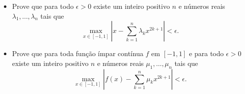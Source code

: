 \begin{itemize}
\item[(a)] Prove que para todo \(\epsilon>0\) existe um inteiro positivo \(n\) e números reais \(\lambda_{1},\dots,\lambda_{n}\) tais que
\[\max_{x\in [-1,1]}|x-\sum_{k=1}^{n}\lambda_{k}x^{2k+1}|<\epsilon.\]
\item[(b)] Prove que para toda função ímpar contínua \(f\) em \([-1,1]\) e para todo \(\epsilon>0\) existe um inteiro positivo \(n\) e números reais \(\mu_{1},\dots,\mu_{n}\) tais que
\[\max_{x\in [-1,1]}|f(x)-\sum_{k=1}^{n}\mu_{k}x^{2k+1}|<\epsilon.\]
\end{itemize}
